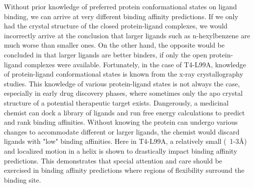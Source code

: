 \documentclass{article}
\begin{document}
Without prior knowledge of preferred protein conformational states on ligand binding, we can arrive at very different binding affinity predictions.
If we only had the crystal structure of the closed protein-ligand complexes, we would incorrectly arrive at the conclusion that larger ligands such as n-hexylbenzene are much worse than smaller ones.
On the other hand, the opposite would be concluded in that larger ligands are better binders, if only the open protein-ligand complexes were available.
Fortunately, in the case of T4-L99A, knowledge of protein-ligand conformational states is known from the x-ray crystallography studies. \cite{Merski2015}
This knowledge of various protein-ligand states is not always the case, especially in early drug discovery phases, where sometimes only the apo crystal structure of a potential therapeutic target exists.
Dangerously, a medicinal chemist can dock a library of ligands and run free energy calculations to predict and rank binding affinities.
Without knowing the protein can undergo various changes to accommodate different or larger ligands, the chemist would discard ligands with "low" binding affinities.
Here in T4-L99A, a relatively small (~1-3\AA) and localized motion in a helix is shown to drastically impact binding affinity predictions.
This demonstrates that special attention and care should be exercised in binding affinity predictions where regions of flexibility surround the binding site.

      
\end{document}
